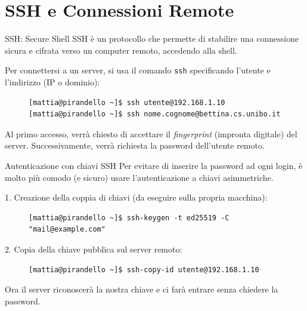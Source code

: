 \section{SSH e Connessioni Remote}

\begin{frame}[fragile]{SSH: Secure Shell}
  SSH è un protocollo che permette di stabilire una connessione sicura e cifrata verso un computer remoto, accedendo alla shell.

  Per connettersi a un server, si usa il comando \texttt{ssh} specificando l'utente e l'indirizzo (IP o dominio):
  \begin{figure}
    \begin{lstlisting}[backgroundcolor=\color{expowhite!50!white}]
[mattia@pirandello ~]$ ssh utente@192.168.1.10
[mattia@pirandello ~]$ ssh nome.cognome@bettina.cs.unibo.it
\end{lstlisting}
  \end{figure}\medskip

  Al primo accesso, verrà chiesto di accettare il \textit{fingerprint} (impronta digitale) del server. Successivamente, verrà richiesta la password dell'utente remoto.
\end{frame}


\begin{frame}[fragile]{Autenticazione con chiavi SSH}
  Per evitare di inserire la password ad ogni login, è molto più comodo (e sicuro) usare l'autenticazione a chiavi asimmetriche.

  1. Creazione della coppia di chiavi (da eseguire sulla propria macchina):
  \begin{figure}
    \begin{lstlisting}[backgroundcolor=\color{expowhite!50!white}]
[mattia@pirandello ~]$ ssh-keygen -t ed25519 -C "mail@example.com"
\end{lstlisting}
  \end{figure}

  2. Copia della chiave pubblica sul server remoto:
  \begin{figure}
    \begin{lstlisting}[backgroundcolor=\color{expowhite!50!white}]
[mattia@pirandello ~]$ ssh-copy-id utente@192.168.1.10
\end{lstlisting}
  \end{figure}
  Ora il server riconoscerà la nostra chiave e ci farà entrare senza chiedere la password.
\end{frame}


